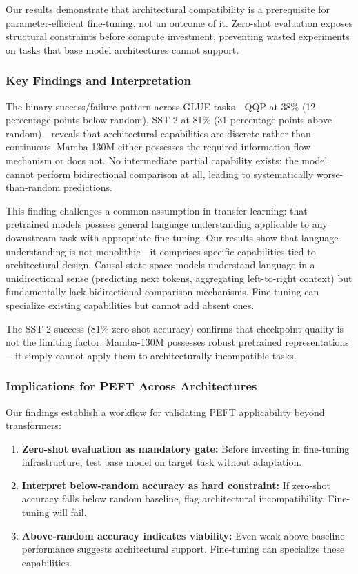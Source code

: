 
Our results demonstrate that architectural compatibility is a prerequisite for parameter-efficient fine-tuning, not an outcome of it. Zero-shot evaluation exposes structural constraints before compute investment, preventing wasted experiments on tasks that base model architectures cannot support.

\subsubsection{Key Findings and Interpretation}

The binary success/failure pattern across GLUE tasks---QQP at 38\% (12 percentage points below random), SST-2 at 81\% (31 percentage points above random)---reveals that architectural capabilities are discrete rather than continuous. Mamba-130M either possesses the required information flow mechanism or does not. No intermediate partial capability exists: the model cannot perform bidirectional comparison at all, leading to systematically worse-than-random predictions.

This finding challenges a common assumption in transfer learning: that pretrained models possess general language understanding applicable to any downstream task with appropriate fine-tuning. Our results show that language understanding is not monolithic---it comprises specific capabilities tied to architectural design. Causal state-space models understand language in a unidirectional sense (predicting next tokens, aggregating left-to-right context) but fundamentally lack bidirectional comparison mechanisms. Fine-tuning can specialize existing capabilities but cannot add absent ones.

The SST-2 success (81\% zero-shot accuracy) confirms that checkpoint quality is not the limiting factor. Mamba-130M possesses robust pretrained representations---it simply cannot apply them to architecturally incompatible tasks.

\subsubsection{Implications for PEFT Across Architectures}

Our findings establish a workflow for validating PEFT applicability beyond transformers:

\begin{enumerate}
\item \textbf{Zero-shot evaluation as mandatory gate:} Before investing in fine-tuning infrastructure, test base model on target task without adaptation.
\item \textbf{Interpret below-random accuracy as hard constraint:} If zero-shot accuracy falls below random baseline, flag architectural incompatibility. Fine-tuning will fail.
\item \textbf{Above-random accuracy indicates viability:} Even weak above-baseline performance suggests architectural support. Fine-tuning can specialize these capabilities.
\end{enumerate}

